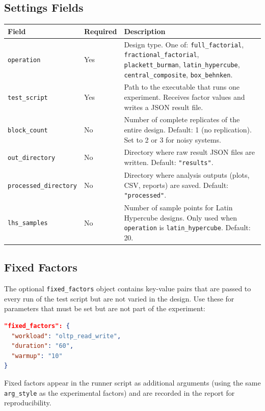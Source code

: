 \documentclass[11pt]{book}
\begin{document}
\subsection{Settings Fields}

\begin{center}
\begin{tabular}{llp{5.5cm}}
\toprule
Field & Required & Description \\
\midrule
\texttt{operation} & Yes & Design type. One of: \texttt{full\_factorial}, \texttt{fractional\_factorial}, \texttt{plackett\_burman}, \texttt{latin\_hypercube}, \texttt{central\_composite}, \texttt{box\_behnken}. \\
\texttt{test\_script} & Yes & Path to the executable that runs one experiment. Receives factor values and writes a JSON result file. \\
\texttt{block\_count} & No & Number of complete replicates of the entire design. Default: 1 (no replication). Set to 2 or 3 for noisy systems. \\
\texttt{out\_directory} & No & Directory where raw result JSON files are written. Default: \texttt{"results"}. \\
\texttt{processed\_directory} & No & Directory where analysis outputs (plots, CSV, reports) are saved. Default: \texttt{"processed"}. \\
\texttt{lhs\_samples} & No & Number of sample points for Latin Hypercube designs. Only used when \texttt{operation} is \texttt{latin\_hypercube}. Default: 20. \\
\bottomrule
\end{tabular}
\end{center}

\subsection{Fixed Factors}

The optional \texttt{fixed\_factors} object contains key-value pairs that are
passed to every run of the test script but are not varied in the design. Use
these for parameters that must be set but are not part of the experiment:

\begin{lstlisting}[language=json]
"fixed_factors": {
  "workload": "oltp_read_write",
  "duration": "60",
  "warmup": "10"
}
\end{lstlisting}

Fixed factors appear in the runner script as additional arguments (using the
same \texttt{arg\_style} as the experimental factors) and are recorded in the
report for reproducibility.
\end{document}
